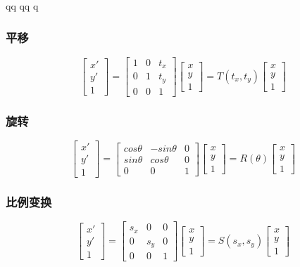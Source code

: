 qq	qq	q                                                                                                                                                                                                                                                                                      \documentclass{article}
\begin{document}
\begin{CJK}{UTF8}{gbsn}
	\subsubsection{平移}
	$$\begin{bmatrix}
	x'\\y'\\1	
	\end{bmatrix}=\begin{bmatrix}
	1&0&t_x\\0&1&t_y\\0&0&1
	\end{bmatrix}
	\begin{bmatrix}
	x\\y\\1
	\end{bmatrix}=T(t_x,t_y)\begin{bmatrix}
	x\\y\\1
	\end{bmatrix}
	$$
	\subsubsection{旋转}
	$$\begin{bmatrix}
	x'\\y'\\1	
	\end{bmatrix}=\begin{bmatrix}
	cos\theta&-sin\theta&0\\sin\theta&cos\theta&0\\0&0&1
	\end{bmatrix}
	\begin{bmatrix}
	x\\y\\1
	\end{bmatrix}=R(\theta)\begin{bmatrix}
	x\\y\\1
	\end{bmatrix}
	$$
	\subsubsection{比例变换}
	$$\begin{bmatrix}
	x'\\y'\\1	
	\end{bmatrix}=\begin{bmatrix}
	s_x&0&0\\0&s_y&0\\0&0&1
	\end{bmatrix}
	\begin{bmatrix}
	x\\y\\1
	\end{bmatrix}=S(s_x,s_y)\begin{bmatrix}
	x\\y\\1
	\end{bmatrix}
	$$

\end{CJK}
\end{document}
